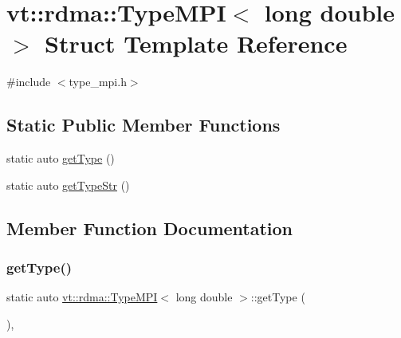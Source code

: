 \hypertarget{structvt_1_1rdma_1_1_type_m_p_i_3_01long_01double_01_4}{}\section{vt\+:\+:rdma\+:\+:Type\+M\+PI$<$ long double $>$ Struct Template Reference}
\label{structvt_1_1rdma_1_1_type_m_p_i_3_01long_01double_01_4}


{\ttfamily \#include $<$type\+\_\+mpi.\+h$>$}

\subsection*{Static Public Member Functions}
\begin{DoxyCompactItemize}
\item 
static auto \hyperlink{structvt_1_1rdma_1_1_type_m_p_i_3_01long_01double_01_4_ab420b61c886e1af10a2bc25b396c9a95}{get\+Type} ()
\item 
static auto \hyperlink{structvt_1_1rdma_1_1_type_m_p_i_3_01long_01double_01_4_ab240e532ee53c92d71395de6d4622a08}{get\+Type\+Str} ()
\end{DoxyCompactItemize}


\subsection{Member Function Documentation}
\mbox{\label{structvt_1_1rdma_1_1_type_m_p_i_3_01long_01double_01_4_ab420b61c886e1af10a2bc25b396c9a95}} 
\subsubsection{\texorpdfstring{get\+Type()}{getType()}}
{\footnotesize\ttfamily static auto \hyperlink{structvt_1_1rdma_1_1_type_m_p_i}{vt\+::rdma\+::\+Type\+M\+PI}$<$ long double $>$\+::get\+Type (\begin{DoxyParamCaption}{ }\end{DoxyParamCaption})\hspace{0.3cm}{\ttfamily [inline]}, {\ttfamily [static]}}

